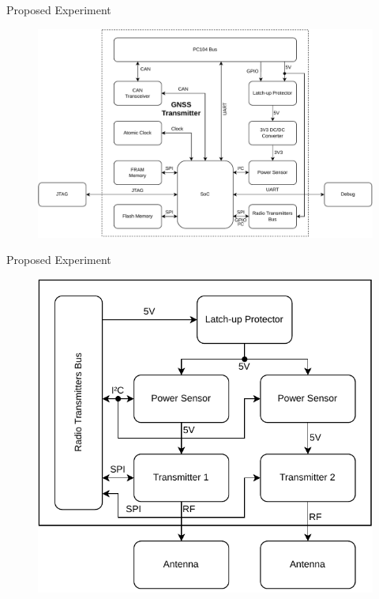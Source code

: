 \begin{frame}{Proposed Experiment}

    \begin{figure}[!ht]
        \begin{center}
            \includegraphics[scale=0.5]{figures/block-diagram}
        \end{center}
    \end{figure}

\end{frame}

\begin{frame}{Proposed Experiment}

    \begin{figure}[!ht]
        \begin{center}
            \includegraphics[scale=0.55]{figures/radios-block-diagram}
        \end{center}
    \end{figure}

\end{frame}
